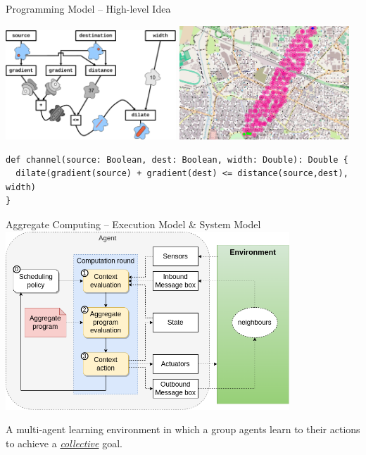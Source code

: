 \documentclass[presentation, 9pt,169]{beamer}\mode<presentation>{\usetheme{AMSBolognaFC}}
\begin{document}
\begin{frame}[fragile]{Programming Model -- High-level Idea}
  \begin{center}
    \includegraphics[width=0.48\textwidth]{img/functions.pdf}
    \includegraphics[width=0.48\textwidth]{img/channel.png}
  \end{center}
\begin{verbatim}
def channel(source: Boolean, dest: Boolean, width: Double): Double {
  dilate(gradient(source) + gradient(dest) <= distance(source,dest), width)
}
  \end{verbatim}

\end{frame}
\begin{frame}{Aggregate Computing -- Execution Model \& System Model}
\centering
\includegraphics[width=0.8\textwidth]{img/execution-step.png}
\end{frame}
\begin{frame}[plain]
  \begin{center}
\huge{}
  \end{center}
  \begin{center}
    \large{A multi-agent learning environment in which a  group agents learn to  their actions to achieve a \emph{\underline{collective}} goal}.
  \end{center}
\end{frame} 
\end{document}
